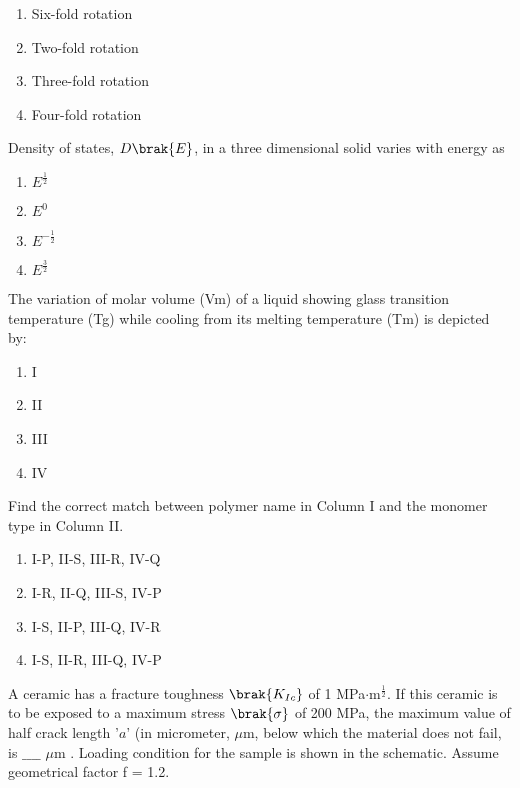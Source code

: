\begin{enumerate}
    \item Six-fold rotation
    \item Two-fold rotation
    \item Three-fold rotation
    \item Four-fold rotation \\
\end{enumerate}
\item Density of states, $D\brak{E}$, in a three dimensional solid varies with energy  as
\begin{enumerate}
    \item $E^{\frac{1}{2}}$
    \item $E^0$
    \item $E^{-\frac{1}{2}}$
    \item $E^{\frac{3}{2}}$ \\
\end{enumerate}
\item The variation of molar volume (Vm) of a liquid showing glass transition temperature (Tg) while cooling from its melting temperature (Tm) is depicted by:
\begin{figure}[!ht]
\centering
\resizebox{0.7\textwidth}{!}{%

}%
\end{figure}
\begin{enumerate}
    \item I
    \item II
    \item III
    \item IV \\
\end{enumerate}
\item Find the correct match between polymer name in Column I and the monomer type in Column II.
\begin{table}[h!]
  \centering
  
\end{table}
\begin{enumerate}
    \item I-P, II-S, III-R, IV-Q
    \item I-R, II-Q, III-S, IV-P
    \item I-S, II-P, III-Q, IV-R
    \item I-S, II-R, III-Q, IV-P \\
\end{enumerate}
\item A ceramic has a fracture toughness $\brak{K_{Ic}}$ of 1 MPa$\cdot\text{m}^\frac{1}{2}$. If this ceramic is to be exposed to a maximum stress $\brak{\sigma}$ of 200 MPa, the maximum value of half crack length '$a$' (in micrometer, $\mu$m, below which the material does not fail, is $\_\_\_\_$ $\mu$m . Loading condition for the sample is shown in the schematic. Assume geometrical factor f = 1.2. \\
